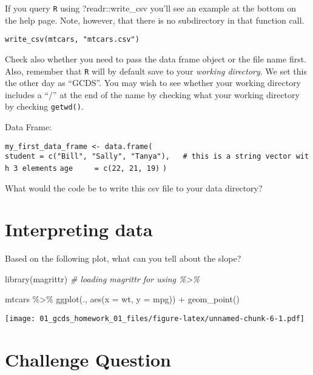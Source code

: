 \documentclass[
]{article}
\newenvironment{Shaded}{\begin{snugshade}}{\end{snugshade}}
\newcommand{\AttributeTok}[1]{\textcolor[rgb]{0.77,0.63,0.00}{#1}}
\newcommand{\CommentTok}[1]{\textcolor[rgb]{0.56,0.35,0.01}{\textit{#1}}}
\newcommand{\FunctionTok}[1]{\textcolor[rgb]{0.00,0.00,0.00}{#1}}
\newcommand{\NormalTok}[1]{#1}
\newcommand{\SpecialCharTok}[1]{\textcolor[rgb]{0.00,0.00,0.00}{#1}}
\begin{document}
If you query \texttt{R} using ?readr::write\_csv you'll see an example
at the bottom on the help page. Note, however, that there is no
subdirectory in that function call.

\texttt{write\_csv(mtcars,\ "mtcars.csv")}

Check also whether you need to pass the data frame object or the file
name first. Also, remember that \texttt{R} will by default save to your
\emph{working directory}. We set this the other day as ``GCDS''. You may
wish to see whether your working directory includes a ``/'' at the end
of the name by checking what your working directory by checking
\texttt{getwd()}.

Data Frame:

\texttt{my\_first\_data\_frame\ \textless{}-\ data.frame(}
\texttt{student\ =\ c("Bill",\ "Sally",\ "Tanya"),\ \ \ \#\ this\ is\ a\ string\ vector\ with\ 3\ elements}
\texttt{age\ \ \ \ \ =\ c(22,\ 21,\ 19)} \texttt{)}

What would the code be to write this csv file to your data directory?

\hypertarget{interpreting-data}{%
\section{Interpreting data}\label{interpreting-data}}

Based on the following plot, what can you tell about the slope?

\begin{Shaded}
\begin{Highlighting}[]
\FunctionTok{library}\NormalTok{(magrittr)                          }\CommentTok{\# loading magrittr for using \%\textgreater{}\%}

\NormalTok{mtcars }\SpecialCharTok{\%\textgreater{}\%}
  \FunctionTok{ggplot}\NormalTok{(., }\FunctionTok{aes}\NormalTok{(}\AttributeTok{x =}\NormalTok{ wt, }\AttributeTok{y =}\NormalTok{ mpg)) }\SpecialCharTok{+}
  \FunctionTok{geom\_point}\NormalTok{()}
\end{Highlighting}
\end{Shaded}

\texttt{[image: 01\_gcds\_homework\_01\_files/figure-latex/unnamed-chunk-6-1.pdf]}

\hypertarget{challenge-question}{%
\section{Challenge Question}\label{challenge-question}}
\end{document}

